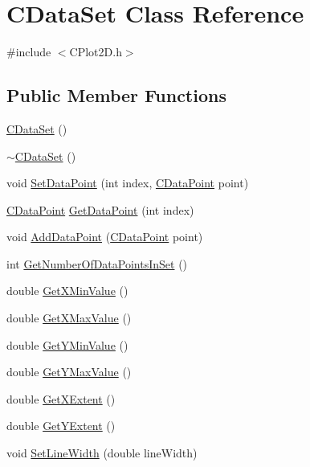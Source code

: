 \hypertarget{class_c_data_set}{\section{C\-Data\-Set Class Reference}
\label{class_c_data_set}
}


{\ttfamily \#include $<$C\-Plot2\-D.\-h$>$}

\subsection*{Public Member Functions}
\begin{DoxyCompactItemize}
\item 
\hyperlink{class_c_data_set_a49ce5d044ca9f5a4f20581128882e133}{C\-Data\-Set} ()
\item 
\hyperlink{class_c_data_set_a6ad28b4e328b29be619a78df6cd93fa9}{$\sim$\-C\-Data\-Set} ()
\item 
void \hyperlink{class_c_data_set_ac3c42608b243f95c33432d8a02d0caef}{Set\-Data\-Point} (int index, \hyperlink{class_c_data_point}{C\-Data\-Point} point)
\item 
\hyperlink{class_c_data_point}{C\-Data\-Point} \hyperlink{class_c_data_set_a899da9d4b1ae802325765f12d077eb99}{Get\-Data\-Point} (int index)
\item 
void \hyperlink{class_c_data_set_a702645af6a9acff5b726e4d9e37838de}{Add\-Data\-Point} (\hyperlink{class_c_data_point}{C\-Data\-Point} point)
\item 
int \hyperlink{class_c_data_set_ad4a39662f691842ab670afe8e5a908a8}{Get\-Number\-Of\-Data\-Points\-In\-Set} ()
\item 
double \hyperlink{class_c_data_set_ade12e4b105f430b574858d821a538553}{Get\-X\-Min\-Value} ()
\item 
double \hyperlink{class_c_data_set_a3e9d415c8a3403f8ca6dbff11d3fa60d}{Get\-X\-Max\-Value} ()
\item 
double \hyperlink{class_c_data_set_a01b45a79a442a2ec365c41d5baf8e332}{Get\-Y\-Min\-Value} ()
\item 
double \hyperlink{class_c_data_set_a0781b4862f8d0a9692e393256bd9bb74}{Get\-Y\-Max\-Value} ()
\item 
double \hyperlink{class_c_data_set_a8c6fea39354287eeb2269753dc92e38b}{Get\-X\-Extent} ()
\item 
double \hyperlink{class_c_data_set_afad32cf12c3b957726aa289bff75da03}{Get\-Y\-Extent} ()
\item 
void \hyperlink{class_c_data_set_ac7b6bbff8660adcfc36106ac553fe344}{Set\-Line\-Width} (double line\-Width)

\end{DoxyCompactItemize}
